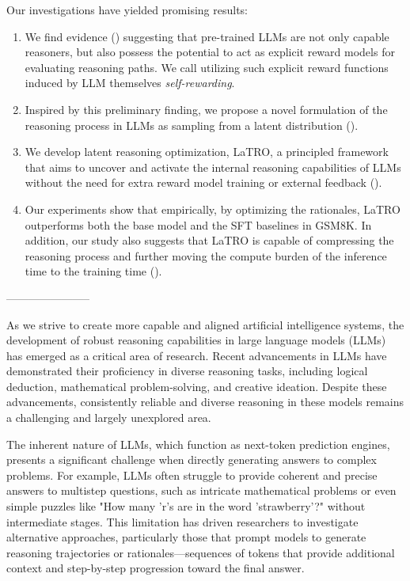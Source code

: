 Our investigations have yielded promising results:
\begin{enumerate}
    \item We find evidence () suggesting that pre-trained LLMs are not only capable reasoners, but also possess the potential to act as explicit reward models for evaluating reasoning paths. We call utilizing such explicit reward functions induced by LLM themselves \emph{self-rewarding}.
    \item Inspired by this preliminary finding, we propose a novel formulation of the reasoning process in LLMs as sampling from a latent distribution ().
    \item We develop latent reasoning optimization, LaTRO, a principled framework that aims to uncover and activate the internal reasoning capabilities of LLMs without the need for extra reward model training or external feedback ().
    \item Our experiments show that empirically, by optimizing the rationales, LaTRO outperforms both the base model and the SFT baselines in GSM8K. In addition, our study also suggests that LaTRO is capable of compressing the reasoning process and further moving the compute burden of the inference time to the training time (). \needsreview
\end{enumerate}






-----------------------



As we strive to create more capable and aligned artificial intelligence systems, the development of robust reasoning capabilities in large language models (LLMs) has emerged as a critical area of research. Recent advancements in LLMs have demonstrated their proficiency in diverse reasoning tasks, including logical deduction, mathematical problem-solving, and creative ideation. Despite these advancements, consistently reliable and diverse reasoning in these models remains a challenging and largely unexplored area.

The inherent nature of LLMs, which function as next-token prediction engines, presents a significant challenge when directly generating answers to complex problems. For example, LLMs often struggle to provide coherent and precise answers to multistep questions, such as intricate mathematical problems or even simple puzzles like "How many 'r's are in the word 'strawberry'?" without intermediate stages. This limitation has driven researchers to investigate alternative approaches, particularly those that prompt models to generate reasoning trajectories or rationales—sequences of tokens that provide additional context and step-by-step progression toward the final answer.

